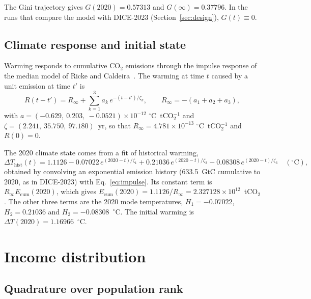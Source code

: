 \documentclass[11pt]{article}
\newcommand{\Ecum}{E_{\mathrm{cum}}}
\begin{document}
The Gini trajectory gives $G(2020) = 0.57313$ and $G(\infty) = 0.37796$. In
the runs that compare the model with DICE-2023 (Section~\ref{sec:design}),
$G(t)\equiv 0$.

\subsection{Climate response and initial state}
\label{sec:climate-constants}

Warming responds to cumulative CO$_2$ emissions through the impulse response
of the median model of Ricke and Caldeira~\cite{RickeCaldeira2014}. The warming
at time $t$ caused by a unit emission at time $t'$ is
\begin{equation}
  R(t - t') = R_\infty + \sum_{k=1}^{3} a_k\, e^{-(t-t')/\zeta_k},
  \qquad R_\infty = -(a_1+a_2+a_3),
  \label{eq:impulse}
\end{equation}
with $a = (-0.629,\ 0.203,\ -0.0521)\times10^{-12}$ $^\circ$C~tCO$_2^{-1}$
and $\zeta = (2.241,\ 35.750,\ 97.180)$~yr, so that $R_\infty =
4.781\times10^{-13}$ $^\circ$C~tCO$_2^{-1}$ and $R(0) = 0$.

The 2020 climate state comes from a fit of historical warming,
\begin{equation}
  \Delta T_{\mathrm{hist}}(t) = 1.1126 - 0.07022\,e^{(2020-t)/\zeta_1}
  + 0.21036\,e^{(2020-t)/\zeta_2} - 0.08308\,e^{(2020-t)/\zeta_3}
  \quad (^\circ\mathrm{C}),
\end{equation}
obtained by convolving an exponential emission history (633.5~GtC cumulative
to 2020, as in DICE-2023) with Eq.~\eqref{eq:impulse}. Its constant term is
$R_\infty\Ecum(2020)$, which gives $\Ecum(2020) = 1.1126/R_\infty =
2.327128\times10^{12}$~tCO$_2$. The other three terms are the 2020 mode
temperatures, $H_1 = -0.07022$, $H_2 = 0.21036$ and $H_3 = -0.08308$~$^\circ$C.
The initial warming is $\Delta T(2020) = 1.16966$~$^\circ$C.

\section{Income distribution}
\label{sec:distribution}

\subsection{Quadrature over population rank}
\end{document}
